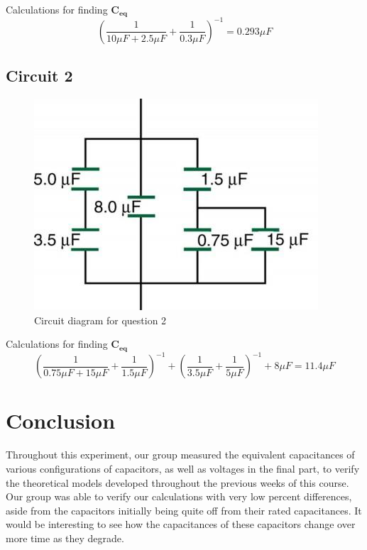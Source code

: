 \documentclass[titlepage]{article}
\begin{document}
    {{Calculations for finding $\mathbf{C_{eq}}$}}
    $$\left( \frac{1}{10\mu F + 2.5 \mu F}+\frac{1}{0.3\mu F} \right)^{-1} = 0.293\mu F$$

    
    	\subsection{Circuit 2}
        \FloatBarrier
        \begin{figure}[hbt!]
            \centering
            \caption{Circuit diagram for question 2}
            \includegraphics{questions/2}
        \end{figure}
        \FloatBarrier

    {{Calculations for finding $\mathbf{C_{eq}}$}}
        $$\left( \frac{1}{0.75\mu F+15\mu F}+\frac{1}{1.5\mu F} \right)^{-1}+\left(\frac{1}{3.5\mu F}+\frac{1}{5\mu F}\right)^{-1}+8\mu F  = 11.4 \mu F$$


    
    
  	\section{Conclusion}
    Throughout this experiment, our group measured the equivalent capacitances of various configurations of capacitors, as well as voltages in the final part, to verify the theoretical models developed throughout the previous weeks of this course. Our group was able to verify our calculations with very low percent differences, aside from the capacitors initially being quite off from their rated capacitances. It would be interesting to see how the capacitances of these capacitors change over more time as they degrade.
\end{document}
